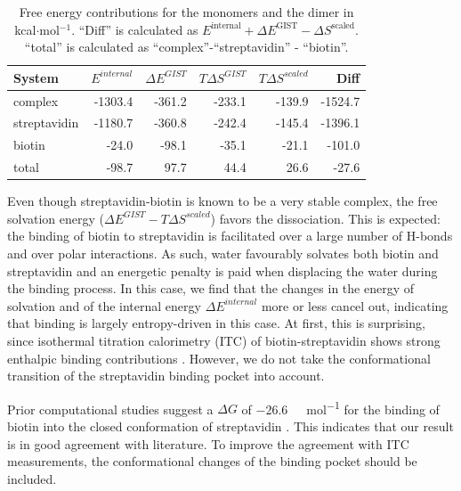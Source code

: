 \documentclass[9pt,tutorial]{livecoms}
\begin{document}
\begin{table}[h]
	\caption{Free energy contributions for the monomers and the dimer in kcal$\cdot$mol$^{-1}$. ``Diff'' is calculated as 
	$E^\text{internal} + \Delta E^\text{GIST} - \Delta S^\text{scaled}$. ``total'' is calculated as 
	``complex''-``streptavidin'' - ``biotin''.}\label{tab_dg_monomers_dimer}
	\small
	\begin{tabular}{@{}lrrrrr@{}}
		\toprule
		System       & $E^{internal}$ & $\Delta E^\textit{GIST}$ & $T\Delta S^\textit{GIST}$ & $T\Delta S^\textit{scaled}$ & Diff \\
		\midrule
		complex      & -1303.4 & -361.2 & -233.1 & -139.9 & -1524.7 \\
		streptavidin & -1180.7 & -360.8 & -242.4 & -145.4 & -1396.1 \\
		biotin       & -24.0   &  -98.1 &  -35.1 &  -21.1 &  -101.0 \\
		\midrule
		total         & -98.7   &   97.7 &   44.4 &   26.6 &   -27.6 \\
		\bottomrule
	\end{tabular}
\end{table}
Even though streptavidin-biotin is known to be a very stable complex, the free solvation energy ($\Delta E^{GIST}-T\Delta S^{scaled}$) favors the dissociation.
This is expected: the binding of biotin to streptavidin is facilitated over a large number of H-bonds and over polar interactions. 
As such, water favourably solvates both biotin and streptavidin and an energetic penalty is paid when displacing the water during the binding process. 
In this case, we find that the changes in the energy of solvation and of the internal energy $\Delta E^{internal}$ more or less cancel out, indicating that binding is largely entropy-driven in this case.
At first, this is surprising, since isothermal titration calorimetry (ITC) of biotin-streptavidin shows strong enthalpic binding contributions \cite{mpye2020-biotin-itc,hyre2006-biotin-itc}.
However, we do not take the conformational transition of the streptavidin binding pocket into account.

Prior computational studies suggest a $\Delta G$ of \SI{-26.6}{\kilo\calorie\per\mole} for the binding of biotin into the closed conformation of streptavidin \cite{Bansal2018-biotin}.
This indicates that our result is in good agreement with literature.
To improve the agreement with ITC measurements, the conformational changes of the binding pocket should be included.
\end{document}
